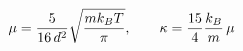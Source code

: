 \documentclass[preview]{standalone}
\begin{document}
\begin{align*}
\special{dvisvgm:raw <g id='unique000'>}\mu=\frac{5}{16\,d^2}\sqrt{\frac{mk_BT}{\pi}},\qquad \kappa=\frac{15}{4}\frac{k_B}{m}\,\mu\special{dvisvgm:raw </g>}
\end{align*}
\end{document}
